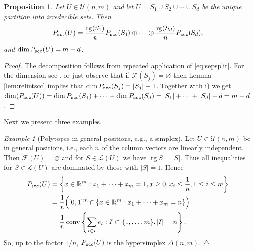 \documentclass[11pt, a4paper, twoside, reqno]{amsart}
\DeclareMathOperator*{\rg}{rg}
\DeclareMathOperator*{\conv}{conv}
\newcommand{\R}{\mathbb{R}}
\newtheorem{proposition}[theorem]{Proposition}
\theoremstyle{definition}
\theoremstyle{remark}
\newtheorem{example}[theorem]{Example}
\newcommand{\scc}{{\tt scc}}
\let\emptyset\varnothing
\numberwithin{equation}{section}
\begin{document}
\begin{proposition} Let $U\in\mathcal{U}(n,m)$ and let $U=S_1\cup S_2 \cup
  \cdots \cup S_d$ be the unique partition into irreducible sets. Then
\begin{equation*}
   P_\scc(U)=\frac{\rg(S_1)}{n}P_\scc(S_1)\oplus  \cdots \oplus \frac{\rg(S_d)}{n}P_\scc(S_d),
 \end{equation*}
and $\dim P_\scc(U)= m-d$.
\label{prop:sccdirect}
\end{proposition}
\begin{proof} The decomposition follows from repeated application of
  \eqref{eq:sepsplit}. For the dimension see \cite[Prop.~
  2.4]{FeichtnerSturmfels2005}, or just observe that
  if $\mathcal{F}(S_j)=\emptyset$ then Lemma \ref{lem:relintscc} implies
  that $\dim P_\scc(S_j)=|S_j|-1$. Together with i) we get $\dim(P_\scc(U))=
  \dim P_\scc(S_1)+\dots + \dim P_\scc(S_d)=|S_1|+\dots+|S_d|-d=m-d$.
\end{proof}
Next we present three examples.
\begin{example}[Polytopes in general positions, e.g.,  a simplex]
  Let $U\in\mathcal{U}(n,m)$ be in general positions, i.e., each $n$ of the
  column vectors are linearly
  independent.  Then $\mathcal{F}(U)=\emptyset$ and for
  $S\in\mathcal{L}(U)$ we have $\rg S= |S|$.  Thus all inequalities
  for $S\in \mathcal{L}(U)$ are dominated by those with $|S|=1$. Hence
  \begin{equation*}
    \begin{split}
     P_\scc(U)& =\left\{x\in\R^{m}: x_1+\dots +x_{m}=1, x\geq 0, x_i\leq
     \frac{1}{n}, 1\leq i\leq m \right\}\\
      & = \frac{1}{n} \Big( [0,1]^{m}\cap\{x\in\R^{m}: x_1+\dots
        +x_{m}=n\} \Big) \\
      &=\frac{1}{n}\conv\left\{\sum_{i\in I} e_i: I\subset\{1,\dots,m\}, |I|=n\right\}.
   \end{split}
 \end{equation*}
So, up to the factor $1/n$, $P_\scc(U)$ is the
hypersimplex $\Delta(n,m)$. \hfill $\triangle$
\label{ex:general}
\end{example}
\end{document}
